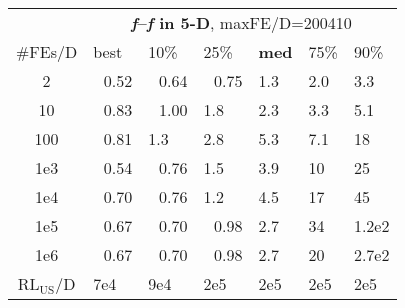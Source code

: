 \begin{tabular}{c|llllll}
 & \multicolumn{6}{|c}{\textbf{\textit{f}\raisebox{-0.35ex}{1}--\textit{f}\raisebox{-0.35ex}{24} in 5-D}, maxFE/D=200410}\\
\#FEs/D & best & 10\% & 25\% & \textbf{med} & 75\% & 90\%\\
2 & ~\,0.52 & ~\,0.64 & ~\,0.75 & \hspace*{1ex}1.3 & \hspace*{1ex}2.0 & \hspace*{1ex}3.3\\
10 & ~\,0.83 & ~\,1.00 & \hspace*{1ex}1.8 & \hspace*{1ex}2.3 & \hspace*{1ex}3.3 & \hspace*{1ex}5.1\\
100 & ~\,0.81 & \hspace*{1ex}1.3 & \hspace*{1ex}2.8 & \hspace*{1ex}5.3 & \hspace*{1ex}7.1 & 18\\
1e3 & ~\,0.54 & ~\,0.76 & \hspace*{1ex}1.5 & \hspace*{1ex}3.9 & 10 & 25\\
1e4 & ~\,0.70 & ~\,0.76 & \hspace*{1ex}1.2 & \hspace*{1ex}4.5 & 17 & 45\\
1e5 & ~\,0.67 & ~\,0.70 & ~\,0.98 & \hspace*{1ex}2.7 & 34 & 1.2e2\\
1e6 & ~\,0.67 & ~\,0.70 & ~\,0.98 & \hspace*{1ex}2.7 & 20 & 2.7e2\\
$\text{RL}_{\text{US}}$/D & 7e4 & 9e4 & 2e5 & 2e5 & 2e5 & 2e5
\end{tabular}
